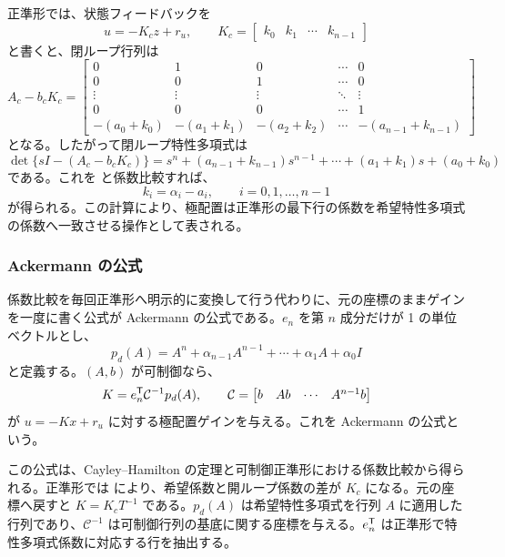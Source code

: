 正準形では、状態フィードバックを
\begin{equation}
  u=-K_cz+r_u,\qquad
  K_c=\begin{bmatrix}k_0&k_1&\cdots&k_{n-1}\end{bmatrix}
\end{equation}
と書くと、閉ループ行列は
\begin{equation}
  A_c-b_cK_c=
  \begin{bmatrix}
    0&1&0&\cdots&0\\
    0&0&1&\cdots&0\\
    \vdots&\vdots&\vdots&\ddots&\vdots\\
    0&0&0&\cdots&1\\
    -(a_0+k_0)&-(a_1+k_1)&-(a_2+k_2)&\cdots&-(a_{n-1}+k_{n-1})
  \end{bmatrix}
\end{equation}
となる。したがって閉ループ特性多項式は
\begin{equation}
  \det\{sI-(A_c-b_cK_c)\}
  =s^n+(a_{n-1}+k_{n-1})s^{n-1}+\cdots+(a_1+k_1)s+(a_0+k_0)
\end{equation}
である。これを  と係数比較すれば、
\begin{equation}
  k_i=\alpha_i-a_i,\qquad i=0,1,\ldots,n-1
  \label{eq:canonical-pole-placement}
\end{equation}
が得られる。この計算により、極配置は正準形の最下行の係数を希望特性多項式の係数へ一致させる操作として表される。

\subsubsection{Ackermann の公式}

係数比較を毎回正準形へ明示的に変換して行う代わりに、元の座標のままゲインを一度に書く公式が Ackermann の公式である。$e_n$ を第 $n$ 成分だけが 1 の単位ベクトルとし、
\begin{equation}
  p_d(A)=A^n+\alpha_{n-1}A^{n-1}+\cdots+\alpha_1A+\alpha_0I
\end{equation}
と定義する。$(A,b)$ が可制御なら、
\begin{equation}
  K=e_n^{\mathsf{T}} \mathcal{C}^{-1}p_d(A),\qquad
  \mathcal{C}=\begin{bmatrix}b&Ab&\cdots&A^{n-1}b\end{bmatrix}
  \label{eq:ackermann}
\end{equation}
が $u=-Kx+r_u$ に対する極配置ゲインを与える。これを Ackermann の公式という。

この公式は、Cayley--Hamilton の定理と可制御正準形における係数比較から得られる。正準形では  により、希望係数と開ループ係数の差が $K_c$ になる。元の座標へ戻すと $K=K_cT^{-1}$ である。$p_d(A)$ は希望特性多項式を行列 $A$ に適用した行列であり、$\mathcal{C}^{-1}$ は可制御行列の基底に関する座標を与える。$e_n^{\mathsf{T}}$ は正準形で特性多項式係数に対応する行を抽出する。

